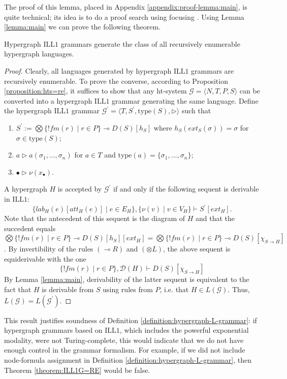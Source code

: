 \documentclass[a4paper,UKenglish,cleveref, autoref, thm-restate,pdfa]{lipics-v2021}
\newcommand{\eqdef}{:=}
\newcommand{\Gram}{\mathcal{G}}
\newcommand{\lab}{\mathit{lab}}
\newcommand{\att}{\mathit{att}}
\newcommand{\ext}{\mathit{ext}}
\newcommand{\type}{\mathrm{type}}
\newcommand{\mconj}{\otimes}
\newcommand{\limpl}{\multimap}
\newcommand{\bang}{{!}}
\newcommand{\ILLFO}{\mathrm{ILL}1}
\newcommand{\fm}{\mathit{fm}}
\newcommand{\diag}{\mathcal{D}}
\begin{document}
The proof of this lemma, placed in Appendix \ref{appendix:proof-lemma:main}, is quite technical; its idea is to do a proof search using focusing \cite{Andreoli92}. Using Lemma \ref{lemma:main} we can prove the following theorem.

\begin{theorem}\label{theorem:ILL1G=RE}
	Hypergraph $\ILLFO$ grammars generate the class of all recursively enumerable hypergraph languages.
\end{theorem}
\begin{proof}
	Clearly, all languages generated by hypergraph $\ILLFO$ grammars are recursively enumerable. To prove the converse, according to Proposition \ref{proposition:hts=re}, it suffices to show that any ht-system $\Gram = \langle N, T, P, S\rangle$ can be converted into a hypergraph $\ILLFO$ grammar generating the same language. 
	Define the hypergraph $\ILLFO$ grammar $\Gram^\prime = \langle T, S^\prime, \type(S), \triangleright \rangle$ such that
	\begin{enumerate}
		\item $S^\prime \eqdef \bigotimes \{\bang \fm(r) \mid r \in P\} \limpl D(S)[h_S]$ where $h_S(\ext_S(\sigma))=\sigma$ for $\sigma \in \type(S)$;
		\item $a \triangleright a(\sigma_1,\ldots,\sigma_n)$ for $a \in T$ and $\type(a)=\{\sigma_1,\ldots,\sigma_n\}$;
		\item $\bullet \triangleright \nu(x_\bullet)$.
	\end{enumerate}
	A hypergraph $H$ is accepted by $\Gram^\prime$ if and only if the following sequent is derivable in $\ILLFO$:
	$$
	\{\lab_H(e)[\att_H(e)] \mid e \in E_H\}, \{\nu(v) \mid v \in V_H\} \vdash S^\prime[\ext_H].
	$$
	Note that the antecedent of this sequent is the diagram of $H$ and that the succedent equals $\bigotimes \{\bang \fm(r) \mid r \in P\} \limpl D(S)[h_S][\ext_H] = \bigotimes \{\bang \fm(r) \mid r \in P\} \limpl D(S)[\chi_{S \to H}]$. By invertibility of the rules $(\limpl R)$ and $(\mconj L)$, the above sequent is equiderivable with the one
	$$
	\{\bang \fm(r) \mid r \in P\}, \diag(H) \vdash D(S)[\chi_{S \to H}]
	$$
	By Lemma \ref{lemma:main}, derivability of the latter sequent is equivalent to the fact that $H$ is derivable from $S$ using rules from $P$, i.e. that $H \in L(\Gram)$. Thus, $L(\Gram)=L(\Gram^\prime)$.
\end{proof}

This result justifies soundness of Definition \ref{definition:hypergraph-L-grammar}: if hypergraph grammars based on $\ILLFO$, which includes the powerful exponential modality, were not Turing-complete, this would indicate that we do not have enough control in the grammar formalism. For example, if we did not include node-formula assignment in Definition \ref{definition:hypergraph-L-grammar}, then Theorem \ref{theorem:ILL1G=RE} would be false.
\end{document}
